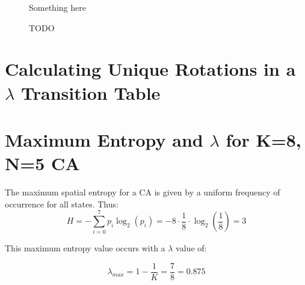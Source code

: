 \documentclass[a4paper,11pt,twoside]{report}
\begin{document}
\begin{appendices}
\begin{figure}
\begin{tabular}{cccc}

\end{tabular}
\caption[Rhomb Single Run Sequence]{
    Something here
}
\label{fig:crh_666_seq}

\end{figure}


\begin{figure}
\centering
\caption[Canonical Grid Data File]{
	TODO
}
\label{fig:gridfile}
\end{figure}

\section{Calculating Unique Rotations in a $\lambda$ Transition Table}
\label{appB:rot}

\section{Maximum Entropy and $\lambda$ for K=8, N=5 CA}
\label{appB:max_H}
The maximum spatial entropy for a CA is given by a uniform frequency of occurrence for all states. Thus:
\begin{equation}
H = - \sum^{7}_{i=0} p_i \log_2(p_i) = - 8 \cdot \frac{1}{8} \cdot \log_2(\frac{1}{8}) = 3
\end{equation}

This maximum entropy value occurs with a $\lambda$ value of:

\begin{equation}
\lambda_{max} = 1 - \frac{1}{K} = \frac{7}{8} = 0.875 
\end{equation}

\processdelayedfloats
\end{appendices}



\end{document}
